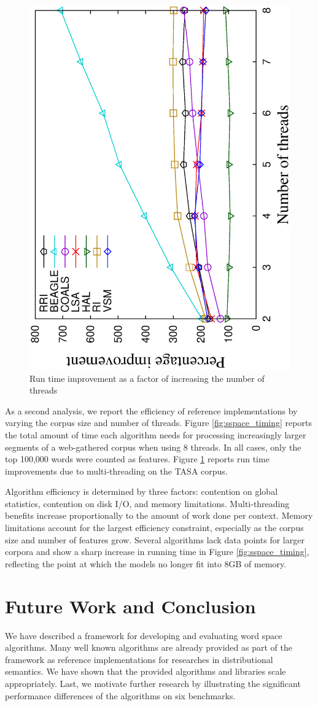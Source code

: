 \begin{figure}[tb]
  \center
  \includegraphics[angle=270,width=.46\textwidth]{figures/threading.eps} 
  \caption{Run time improvement as a factor of increasing the number of
    threads}
  \label{fig:sspace_threads} 
\end{figure}


As a second analysis, we report the efficiency of reference implementations by
varying the corpus size and number of threads.  Figure \ref{fig:sspace_timing}
reports the total amount of time each algorithm needs for processing
increasingly larger segments of a web-gathered corpus when using 8 threads. In
all cases, only the top 100,000 words were counted as features.  Figure
\ref{fig:sspace_threads} reports run time improvements due to multi-threading on
the TASA corpus.

Algorithm efficiency is determined by three factors: contention on global
statistics, contention on disk I/O, and memory limitations.  Multi-threading
benefits increase proportionally to the amount of work done per context.  Memory
limitations account for the largest efficiency constraint, especially as the
corpus size and number of features grow.  Several algorithms lack data points
for larger corpora and show a sharp increase in running time in Figure
\ref{fig:sspace_timing}, reflecting the point at which the models no longer fit
into 8GB of memory.

\section{Future Work and Conclusion}

We have described a framework for developing and evaluating word space
algorithms.  Many well known algorithms are already provided as part of the
framework as reference implementations for researches in distributional
semantics.  We have shown that the provided algorithms and libraries scale
appropriately.  Last, we motivate further research by illustrating the
significant performance differences of the algorithms on six benchmarks.

